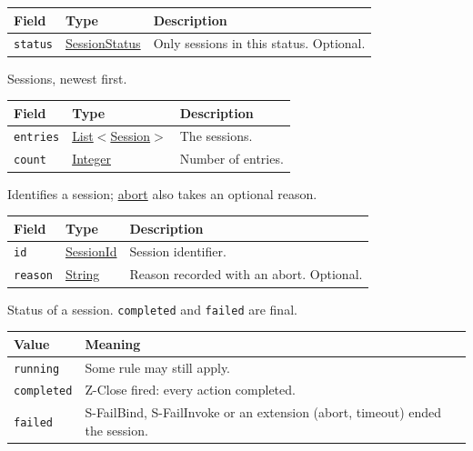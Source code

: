 \documentclass[a4paper]{arrowhead}
\newcommand{\mref}[1]{{\textcolor{ArrowheadPurple}{\hyperref[sec:model:#1]{#1}}}}
\newcommand{\oref}[1]{{\textcolor{ArrowheadBlue}{\hyperref[sec:operations:#1]{#1}}}}
\newcommand{\pref}[1]{{\textcolor{ArrowheadGrey}{\hyperref[sec:model:primitives:#1]{#1}}}}
\begin{document}
{\small
\begin{longtable}{|p{3.9cm}|p{4.4cm}|p{7.5cm}|}

\hline
\rowcolor{gray!33} Field & Type & Description \\ \hline
\endhead
\texttt{status} & \mref{SessionStatus} & Only sessions in this status. Optional. \\ \hline
\end{longtable}
}

Sessions, newest first.

{\small
\begin{longtable}{|p{3.9cm}|p{4.4cm}|p{7.5cm}|}

\hline
\rowcolor{gray!33} Field & Type & Description \\ \hline
\endhead
\texttt{entries} & \pref{List}$<$\mref{Session}$>$ & The sessions. \\ \hline
\texttt{count} & \pref{Integer} & Number of entries. \\ \hline
\end{longtable}
}

Identifies a session; \oref{abort} also takes an optional reason.

{\small
\begin{longtable}{|p{3.9cm}|p{4.4cm}|p{7.5cm}|}

\hline
\rowcolor{gray!33} Field & Type & Description \\ \hline
\endhead
\texttt{id} & \pref{SessionId} & Session identifier. \\ \hline
\texttt{reason} & \pref{String} & Reason recorded with an abort. Optional. \\ \hline
\end{longtable}
}

Status of a session. \texttt{completed} and \texttt{failed} are final.

{\small
\begin{longtable}{|p{3.9cm}|p{11.9cm}|}

\hline
\rowcolor{gray!33} Value & Meaning \\ \hline
\endhead
\texttt{running} & Some rule may still apply. \\ \hline
\texttt{completed} & Z-Close fired: every action completed. \\ \hline
\texttt{failed} & S-FailBind, S-FailInvoke or an extension (abort, timeout) ended the session. \\ \hline
\end{longtable}
}
\end{document}

